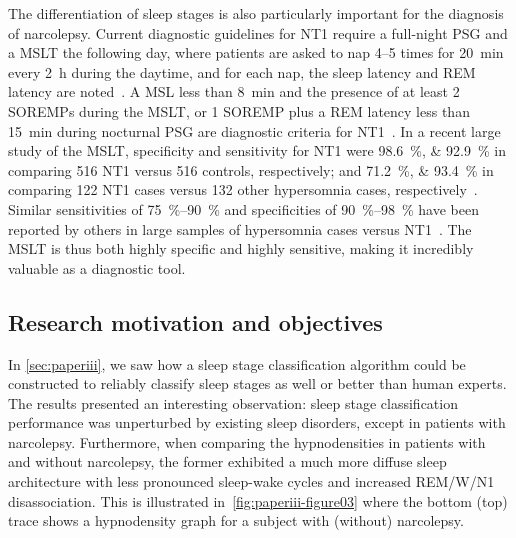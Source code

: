The differentiation of sleep stages is also particularly important for the diagnosis of narcolepsy.
Current diagnostic guidelines for \ac{NT1} require a full-night \ac{PSG} and a \ac{MSLT} the following day, where patients are asked to nap \numrange{4}{5} times for \SI{20}{\minute} every \SI{2}{\hour} during the daytime, and for each nap, the sleep latency and \ac{REM} latency are noted~\cite{Littner2005}.
A \ac{MSL} less than \SI{8}{\minute} and the presence of at least \num{2} \acp{SOREMP} during the \ac{MSLT}, or \num{1} \ac{SOREMP} plus a \ac{REM} latency less than \SI{15}{\minute} during nocturnal \ac{PSG} are diagnostic criteria for \ac{NT1}~\cite{AmericanAcademyofSleepMedicine2014}.
In a recent large study of the \ac{MSLT}, specificity and sensitivity for \ac{NT1} were \SIlist{98.6;92.9}{\percent} in comparing \num{516} \ac{NT1} versus \num{516} controls, respectively; and \SIlist{71.2;93.4}{\percent} in comparing \num{122} \ac{NT1} cases versus \num{132} other hypersomnia cases, respectively~\cite{Andlauer2013}.
Similar sensitivities of \SIrange{75}{90}{\percent} and specificities of \SIrange{90}{98}{\percent} have been reported by others in large samples of hypersomnia cases versus \ac{NT1}~\cite{Mignot2002,Andlauer2012,Luca2013,Dauvilliers2004,Moscovitch1993}. 
The \ac{MSLT} is thus both highly specific and highly sensitive, making it incredibly valuable as a diagnostic tool. 

\subsection{Research motivation and objectives}

In \cref{sec:paperiii}, we saw how a sleep stage classification algorithm could be constructed to reliably classify sleep stages as well or better than human experts.
The results presented an interesting observation: sleep stage classification performance was unperturbed by existing sleep disorders, except in patients with narcolepsy.
Furthermore, when comparing the hypnodensities in patients with and without narcolepsy, the former exhibited a much more diffuse sleep architecture with less pronounced sleep-wake cycles and increased \ac{REM}/\ac{W}/\ac{N1} disassociation. 
This is illustrated in~\cref{fig:paperiii-figure03} where the bottom (top) trace shows a hypnodensity graph for a subject with (without) narcolepsy.

